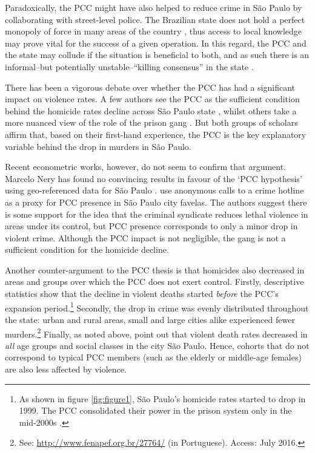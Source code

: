 Paradoxically, the PCC might have also helped to reduce crime in São Paulo by collaborating with street-level police. The Brazilian state does not hold a perfect monopoly of force in many areas of the country \citep{arias2009drugs,de2012governo,hughes2004,pinheiro2000}, thus access to local knowledge may prove vital for the success of a given operation. In this regard, the PCC and the state may collude if the situation is beneficial to both, and as such there is an informal--but potentially unstable--``killing consensus'' in the state \citep{willis2014antagonistic, willis2015killing}.

There has been a vigorous debate over whether the PCC has had a significant impact on violence rates. A few authors see the PCC as the sufficient condition behind the homicide rates decline across São Paulo state \citep{biondi2010, dias2009, dias2011pulverizaccao}, whilst others take a more nuanced view of the role of the prison gang \citep[e.g.][]{willis2015killing}. But both groups of scholars affirm that, based on their first-hand experience, the PCC is the key explanatory variable behind the drop in murders in São Paulo.

Recent econometric works, however, do not seem to confirm that argument. Marcelo Nery has found no convincing results in favour of the `PCC hypothesis' using geo-referenced data for São Paulo \citep{bbc2016pcc}. \citet{biderman2015pax} use anonymous calls to a crime hotline as a proxy for PCC presence in São Paulo city favelas. The authors suggest there is some support for the idea that the criminal syndicate reduces lethal violence in areas under its control, but PCC presence corresponds to only a minor drop in violent crime. Although the PCC impact is not negligible, the gang is not a sufficient condition for the homicide decline.

Another counter-argument to the PCC thesis is that homicides also decreased in areas and groups over which the PCC does not exert control. Firstly, descriptive statistics show that the decline in violent deaths started \emph{before} the PCC's expansion period.\footnote{As shown in figure \ref{fig:figure1}, São Paulo's homicide rates started to drop in 1999. The PCC consolidated their power in the prison system only in the mid-2000s \citep{dias2011pulverizaccao}.} Secondly, the drop in crime was evenly distributed throughout the state: urban and rural areas, small and large cities alike experienced fewer murders.\footnote{See: \url{http://www.fenapef.org.br/27764/} (in Portuguese). Access: July 2016.} Finally, as noted above, \citet{peres2011queda} point out that violent death rates decreased in \emph{all} age groups and social classes in the city São Paulo. Hence, cohorts that do not correspond to typical PCC members (such as the elderly or middle-age females) are also less affected by violence. 

